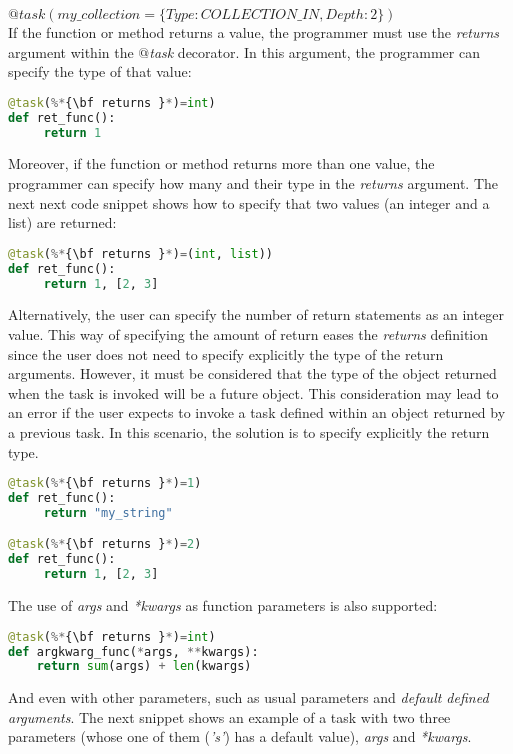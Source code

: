 $@task(my\_collection=\{Type: COLLECTION\_IN, Depth: 2\})$ \\

If the function or method returns a value, the programmer must use the {\it returns}  argument within
the {\it $@$task} decorator. In this argument, the programmer can specify the type of that value:

\begin{lstlisting}[language=python]
@task(%*{\bf returns }*)=int)
def ret_func():
     return 1
\end{lstlisting}

Moreover, if the function or method returns more than one value, the programmer can specify how many 
and their type in the {\it returns} argument. The next next code snippet shows how to specify that two 
values (an integer and a list) are returned:

\begin{lstlisting}[language=python]
@task(%*{\bf returns }*)=(int, list))
def ret_func():
     return 1, [2, 3]
\end{lstlisting}

Alternatively, the user can specify the number of return statements as an integer value. This way of
specifying the amount of return eases the {\it returns} definition since the user does not need to
specify explicitly the type of the return arguments. However, it must be considered that the type 
of the object returned when the task is invoked will be a future object.
This consideration may lead to an error if the user expects to invoke a task defined within an object
returned by a previous task. In this scenario, the solution is to specify explicitly the return type.

\begin{lstlisting}[language=python]
@task(%*{\bf returns }*)=1)
def ret_func():
     return "my_string"

@task(%*{\bf returns }*)=2)
def ret_func():
     return 1, [2, 3]
\end{lstlisting}

The use of {\it *args} and {\it **kwargs} as function parameters is also supported:

\begin{lstlisting}[language=python]
@task(%*{\bf returns }*)=int)
def argkwarg_func(*args, **kwargs):
    return sum(args) + len(kwargs)
\end{lstlisting}

And even with other parameters, such as usual parameters and {\it default defined arguments}. The next 
snippet shows an example of a task with two three parameters (whose one of them ({\it 's'}) has a default
value), {\it *args} and {\it **kwargs}.

